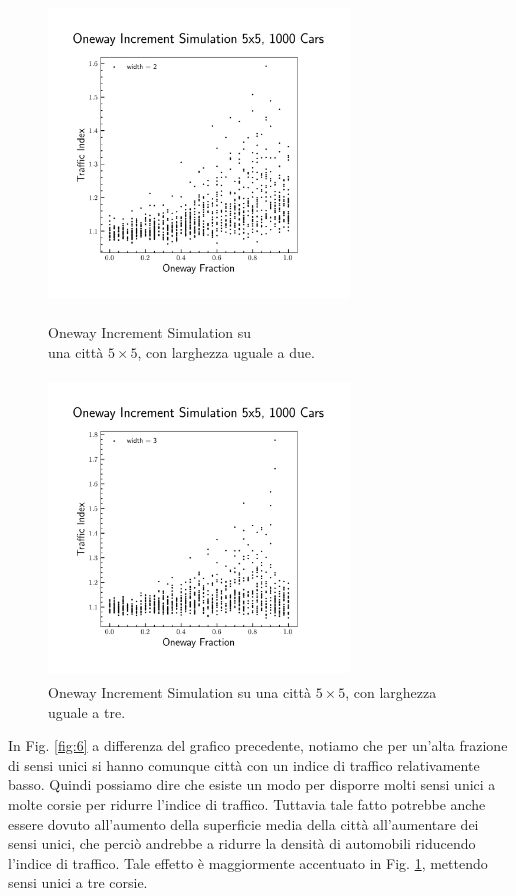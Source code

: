 \documentclass[main.tex]{subfiles}
\begin{document}
        \begin{figure}[H]
            \begin{minipage}{.5\textwidth}
                \centering
                \includegraphics[width=8cm, height=8cm]{oneway_increment_2.png}  
                \caption{Oneway Increment Simulation su\\ una città $5 \times 5$, con larghezza uguale a due.}
                \label{fig:6}
            \end{minipage}
            \begin{minipage}{.5\textwidth}
                \centering
                \includegraphics[width=8cm, height=8cm]{oneway_increment_3.png}  
                \caption{Oneway Increment Simulation su una città $5 \times 5$, con larghezza uguale a tre.}
                \label{fig:7}
            \end{minipage}
        \end{figure}

        In Fig. \ref{fig:6} a differenza del grafico precedente, notiamo che per un'alta frazione di sensi unici si hanno comunque città
        con un indice di traffico relativamente basso. Quindi possiamo dire che esiste un modo per disporre molti sensi unici a molte corsie per
        ridurre l'indice di traffico. Tuttavia tale fatto potrebbe anche essere dovuto all'aumento della superficie media della città all'aumentare dei 
        sensi unici, che perciò andrebbe a ridurre la densità di automobili riducendo l'indice di traffico.
        Tale effetto è maggiormente accentuato in Fig. \ref{fig:7}, mettendo sensi unici a tre corsie.\\
        \hfill\\
\end{document}
